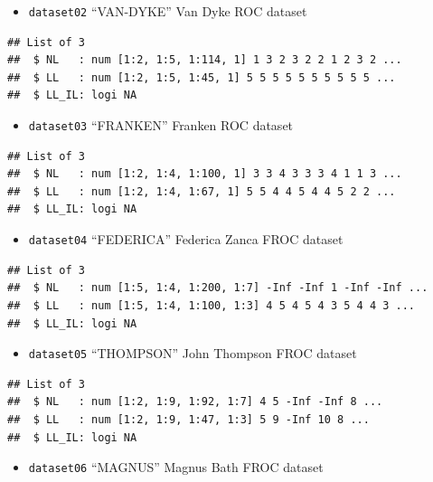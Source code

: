 \documentclass[
]{book}
\providecommand{\tightlist}{%
  \setlength{\itemsep}{0pt}\setlength{\parskip}{0pt}}
\begin{document}
\begin{itemize}
\tightlist
\item
  \texttt{dataset02} ``VAN-DYKE'' Van Dyke ROC dataset \citep{RN1993}
\end{itemize}

\begin{verbatim}
## List of 3
##  $ NL   : num [1:2, 1:5, 1:114, 1] 1 3 2 3 2 2 1 2 3 2 ...
##  $ LL   : num [1:2, 1:5, 1:45, 1] 5 5 5 5 5 5 5 5 5 5 ...
##  $ LL_IL: logi NA
\end{verbatim}

\begin{itemize}
\tightlist
\item
  \texttt{dataset03} ``FRANKEN'' Franken ROC dataset \citep{RN1995}
\end{itemize}

\begin{verbatim}
## List of 3
##  $ NL   : num [1:2, 1:4, 1:100, 1] 3 3 4 3 3 3 4 1 1 3 ...
##  $ LL   : num [1:2, 1:4, 1:67, 1] 5 5 4 4 5 4 4 5 2 2 ...
##  $ LL_IL: logi NA
\end{verbatim}

\begin{itemize}
\tightlist
\item
  \texttt{dataset04} ``FEDERICA'' Federica Zanca FROC dataset \citep{RN1882}
\end{itemize}

\begin{verbatim}
## List of 3
##  $ NL   : num [1:5, 1:4, 1:200, 1:7] -Inf -Inf 1 -Inf -Inf ...
##  $ LL   : num [1:5, 1:4, 1:100, 1:3] 4 5 4 5 4 3 5 4 4 3 ...
##  $ LL_IL: logi NA
\end{verbatim}

\begin{itemize}
\tightlist
\item
  \texttt{dataset05} ``THOMPSON'' John Thompson FROC dataset \citep{RN2368}
\end{itemize}

\begin{verbatim}
## List of 3
##  $ NL   : num [1:2, 1:9, 1:92, 1:7] 4 5 -Inf -Inf 8 ...
##  $ LL   : num [1:2, 1:9, 1:47, 1:3] 5 9 -Inf 10 8 ...
##  $ LL_IL: logi NA
\end{verbatim}

\begin{itemize}
\tightlist
\item
  \texttt{dataset06} ``MAGNUS'' Magnus Bath FROC dataset \citep{RN1929}
\end{itemize}
\end{document}
